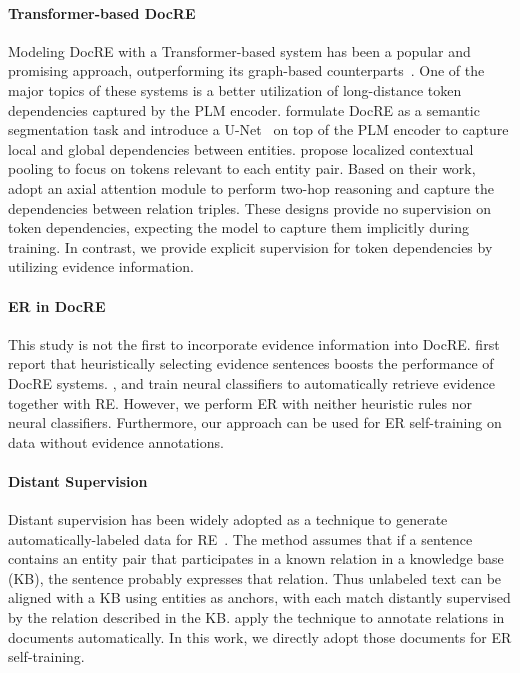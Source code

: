 \documentclass[11pt]{article}
\begin{document}
\paragraph{Transformer-based DocRE} Modeling DocRE with a Transformer-based system has been a popular and promising approach, outperforming its graph-based counterparts~\cite{zeng-etal-2020-double,zeng-etal-2021-sire,xu-etal-2021-reconstruct}.
One of the major topics of these systems is a better utilization of long-distance token dependencies captured by the PLM encoder.
\citet{zhang-etal-2021-document} formulate DocRE as a semantic segmentation task and introduce a U-Net~\cite{ronneberger-etal-2015-unet} on top of the PLM encoder to capture local and global dependencies between entities.
\citet{zhou2021atlop} propose localized contextual pooling to focus on tokens relevant to each entity pair.
Based on their work, \citet{tan-etal-2022-document} adopt an axial attention module to perform two-hop reasoning and capture the dependencies between relation triples.
These designs provide no supervision on token dependencies, expecting the model to capture them implicitly during training.
In contrast, we provide explicit supervision for token dependencies by utilizing evidence information.


\paragraph{ER in DocRE} This study is not the first to incorporate evidence information into DocRE.
\citet{huang-etal-2021-three} first report that heuristically selecting evidence sentences boosts the performance of DocRE systems.  
\citet{huang-etal-2021-entity}, \citet{xie-etal-2022-eider} and \citet{xiao-etal-2022-sais} train neural classifiers to automatically retrieve evidence together with RE.
However, we perform ER with neither heuristic rules nor neural classifiers.
Furthermore, our approach can be used for ER self-training on data without evidence annotations.

\paragraph{Distant Supervision} Distant supervision has been widely adopted as a technique to generate automatically-labeled data for RE~\cite{mintz-etal-2009-distant,quirk-poon-2017-distant,xiao-etal-2020-denoising}.
The method assumes that if a sentence contains an entity pair that participates in a known relation in a knowledge base (KB), the sentence probably expresses that relation.
Thus unlabeled text can be aligned with a KB using entities as anchors, with each match distantly supervised by the relation described in the KB.
\citet{yao-etal-2019-docred} apply the technique to annotate relations in documents automatically.
In this work, we directly adopt those documents for ER self-training.
\end{document}
